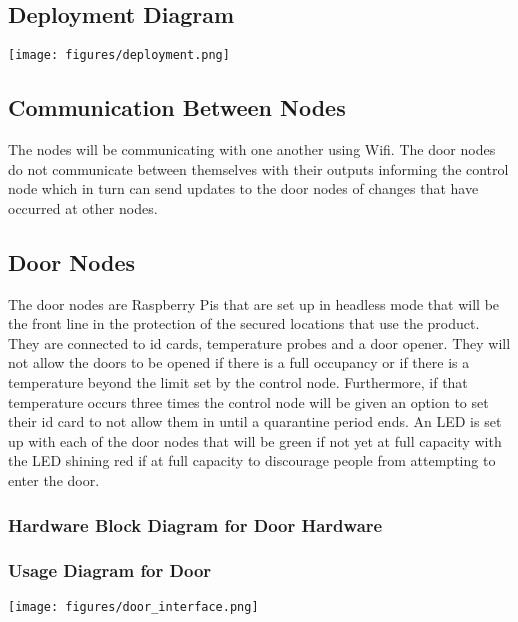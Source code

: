 \subsection{Deployment Diagram}

\texttt{[image: figures/deployment.png]}

\subsection{Communication Between Nodes}
The nodes will be communicating with one another using Wifi. The door nodes do
not communicate between themselves with their outputs informing the control node
which in turn can send updates to the door nodes of changes that have occurred
at other nodes.

\subsection{Door Nodes}
The door nodes are Raspberry Pis that are set up in headless mode that will be
the front line in the protection of the secured locations that use the product.
They are connected to id cards, temperature probes and a door opener. They will
not allow the doors to be opened if there is a full occupancy or if there is a
temperature beyond the limit set by the control node. Furthermore, if that
temperature occurs three times the control node will be given an option to set
their id card to not allow them in until a quarantine period ends. An LED is set
up with each of the door nodes that will be green if not yet at full capacity
with the LED shining red if at full capacity to discourage people from
attempting to enter the door.


\subsubsection{Hardware Block Diagram for Door Hardware}

\subsubsection{Usage Diagram for Door}

\texttt{[image: figures/door\_interface.png]}

